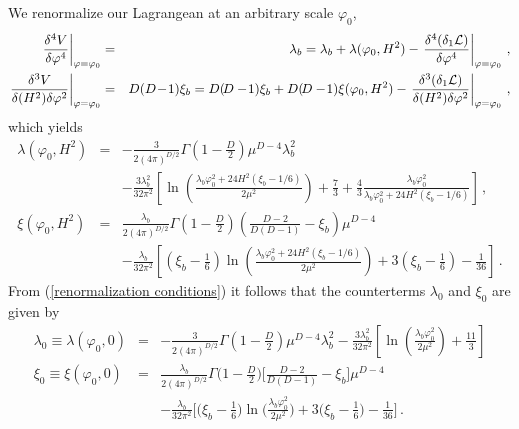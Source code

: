 \documentclass[aps,12pt,superscriptaddress,preprintnumbers,
                secnumarabic,nofootinbib,showpacs]{revtex4}
\begin{document}
We renormalize our Lagrangean at an arbitrary scale $\varphi_0$,
\begin{eqnarray}
\left.
\frac{\delta^4V}{\delta\varphi^4}\right|_{\varphi=\varphi_0} &=&
\lambda_b = \lambda_b + \lambda({\varphi_0},H^2) -
\left. \frac{\delta^4(\delta_1{\cal L})}{\delta\varphi^4}\right|_{\varphi=\varphi_0}\,,\nonumber\\
\left.
\frac{\delta^3V}{\delta(H^2)\delta\varphi^2}\right|_{\varphi=\varphi_0}
&=& D(D\!-\!1)\xi_b = D(\!D-\!1)\xi_b +
D(\!D-\!1)\xi(\varphi_0,H^2) - \left. \frac{\delta^3(\delta_1{\cal
L})}{\delta(H^2)\delta\varphi^2}\right|_{\varphi=\varphi_0}\,,
\label{renormalization conditions}
\end{eqnarray}
which yields
\begin{eqnarray}
\lambda({\varphi_0},H^2) &=&
-\frac{3}{2(4\pi)^{D/2}}\Gamma(1-\frac{D}{2})\mu^{D-4}\lambda_b^2
\nonumber
\\
& &
-\frac{3\lambda_b^2}{32\pi^2}\left[\ln\left(\frac{\lambda_b\varphi_0^2+24H^2(\xi_b-1/6)}{{2\mu^2}}\right)
+\frac73 +
\frac43\frac{\lambda_b\varphi_0^2}{\lambda_b\varphi_0^2+24H^2(\xi_b-1/6)}
\right]
\,,
\nonumber\\
\xi(\varphi_0,H^2)
  &=&\frac{\lambda_b}{2(4\pi)^{D/2}}
           \Gamma(1-\frac{D}{2})\left(\frac{D-2}{D(D-1)}-\xi_b\right)\mu^{D-4}
\nonumber\\
    & &-\frac{\lambda_b}{32\pi^2}\left[\left(\xi_b-\frac16\right)\ln\left(
    \frac{\lambda_b\varphi_0^2+24H^2(\xi_b-1/6)}{{2\mu^2}}\right)
         +3\left(\xi_b-\frac16\right)-\frac{1}{36}\right]
\,.
\end{eqnarray}
From (\ref{renormalization conditions}) it follows that the
counterterms $\lambda_0$ and $\xi_0$ are given by
\begin{eqnarray}
\lambda_0 \equiv \lambda({\varphi_0},0) &=&
-\frac{3}{2(4\pi)^{D/2}}\Gamma\left(1-\frac{D}{2}\right)\mu^{D-4}\lambda_b^2
-\frac{3\lambda_b^2}{32\pi^2}\left[\ln\left(\frac{\lambda_b\varphi_0^2}{2\mu^2}\right)+\frac{11}{3}\right]\nonumber\\
\xi_0 \equiv \xi({\varphi_0},0) &=&
\frac{\lambda_b}{2(4\pi)^{D/2}}
                \Gamma\Big(1-\frac{D}{2}\Big)
                       \bigg[\frac{D\!-\!2}{D(D-1)}-\xi_b\bigg]
                       \mu^{D-4}
\nonumber\\
         & & -\frac{\lambda_b}{32\pi^{2}}\bigg[\Big(\xi_b-\frac{1}{6}\Big)
                       \ln\Big(\frac{\lambda_b\varphi_0^{2}}{2\mu^{2}}\Big)
                       +3\Big(\xi_b-\frac{1}{6}\Big)-\frac{1}{36}\bigg]
\,.
\label{counterterms}
\end{eqnarray}
\end{document}
